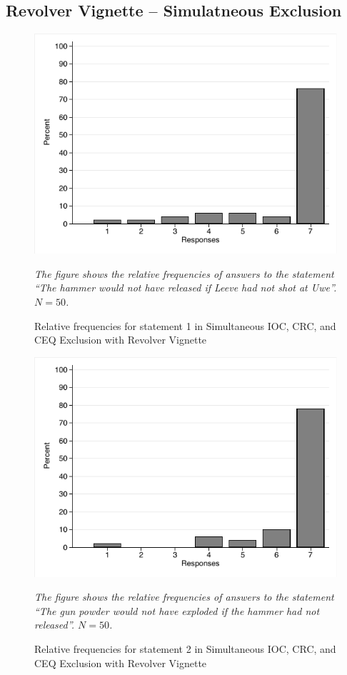 \documentclass[egregdoesnotlikesansseriftitles,12pt]{scrartcl}
\begin{document}
\subsection{Revolver Vignette -- Simulatneous Exclusion}
\begin{figure}[H]
   \centering
   \includegraphics[scale=0.8]{figures/rev_com_hist_1.pdf}
   \begin{minipage}{0.9\linewidth}
   \footnotesize
   \emph{The figure shows the relative frequencies of answers to the statement ``The hammer would not have released if Leeve had not shot at Uwe''. $N=50$.}
   \end{minipage}
   \caption{Relative frequencies for statement 1 in Simultaneous IOC, CRC, and CEQ Exclusion with Revolver Vignette}
   \label{fig:rev_com_hist_1}
\end{figure}

\begin{figure}[H]
   \centering
   \includegraphics[scale=0.8]{figures/rev_com_hist_2.pdf}
   \begin{minipage}{0.9\linewidth}
   \footnotesize
   \emph{The figure shows the relative frequencies of answers to the statement ``The gun powder would not have exploded if the hammer had not released''. $N=50$.}
   \end{minipage}
   \caption{Relative frequencies for statement 2 in Simultaneous IOC, CRC, and CEQ Exclusion with Revolver Vignette}
   \label{fig:rev_com_hist_2}
\end{figure}
\end{document}
